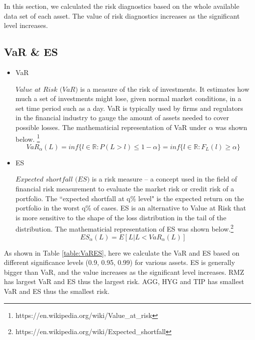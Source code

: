 In this section, we calculated the risk diagnostics based on the whole available data set of each asset. The value of risk diagnostics increases as the significant level increases.  

\subsection{VaR \& ES}

\begin{itemize}
\item VaR

$\textit{Value at Risk (VaR)} $  is a measure of the risk of investments. It estimates how much a set of investments might lose, given normal market conditions, in a set time period such as a day. VaR is typically used by firms and regulators in the financial industry to gauge the amount of assets needed to cover possible losses. The mathematicial representation of VaR under $\alpha$ was shown below. \footnote{https://en.wikipedia.org/wiki/Value\_at\_risk}
\begin{equation}
VaR_{\alpha}(L) = inf\{l \in \mathbb{R} : P(L > l) \leq 1-\alpha \} = 
inf\{l \in \mathbb{R} : F_L(l) \geq \alpha \}
\end{equation}
\item ES

$\textit{Expected shortfall (ES)}$ is a risk measure -- a concept used in the field of financial risk measurement to evaluate the market risk or credit risk of a portfolio. The ``expected shortfall at q\% level" is the expected return on the portfolio in the worst q\% of cases. ES is an alternative to Value at Risk that is more sensitive to the shape of the loss distribution in the tail of the distribution. The mathematicial representation of ES was shown below.\footnote{https://en.wikipedia.org/wiki/Expected\_shortfall}
\begin{equation}
ES_{\alpha}(L) = E\left[ L \vert L<VaR_{\alpha}(L) \right]
\end{equation}

\end{itemize}

As shown in Table \ref{table:VaRES}, here we calculate the VaR and ES based on different significance levels (0.9, 0.95, 0.99) for various assets. ES is generally bigger than VaR, and the value increases as the significant level increases. RMZ has largest VaR and ES thus the largest risk. AGG, HYG and TIP has smallest VaR and ES thus the smallest risk. 

